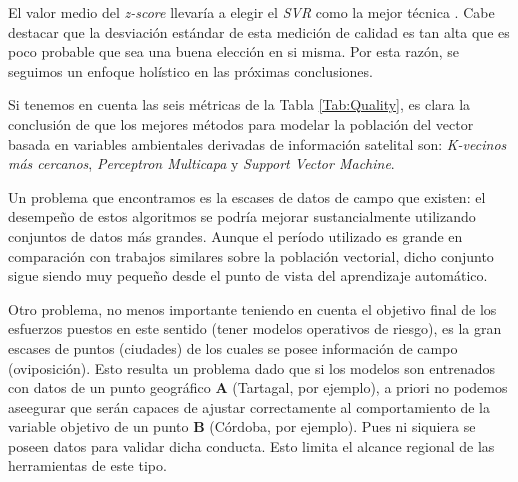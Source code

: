   \par El valor medio del \textit{z-score} llevaría a elegir el \textit{SVR}
    como la mejor técnica \cite{ml_rainfall}. Cabe destacar que la desviación
    estándar de esta medición de calidad es tan alta que es poco probable que
    sea una buena elección en si misma. Por esta razón, se seguimos un
    enfoque holístico en las próximas conclusiones.


  \par Si tenemos en cuenta las seis métricas de la Tabla \ref{Tab:Quality},
    es clara la conclusión de que los mejores métodos para modelar la población
    del vector basada en variables ambientales derivadas de información satelital
    son: \textit{K-vecinos más cercanos}, \textit{Perceptron
    Multicapa} y \textit{Support Vector Machine}.

  \par Un problema que encontramos es la escases de datos de campo que existen:
    el desempeño de estos algoritmos se podría mejorar sustancialmente utilizando
    conjuntos de datos más grandes.
    Aunque el período utilizado es grande en comparación con trabajos similares
    sobre la población vectorial, dicho conjunto sigue siendo
    muy pequeño desde el punto de vista del aprendizaje automático.

  \par Otro problema, no menos importante teniendo en cuenta el objetivo final
    de los esfuerzos puestos en este sentido (tener modelos operativos de
    riesgo), es la gran escases de puntos (ciudades) de los cuales se posee información
    de campo (oviposición). Esto resulta un problema dado que si los modelos son
    entrenados con datos de un punto geográfico \textbf{A} (Tartagal, por ejemplo), a
    priori no podemos aseegurar que serán capaces de ajustar correctamente al
    comportamiento de la variable objetivo de un punto \textbf{B} (Córdoba, por ejemplo).
    Pues ni siquiera se poseen datos para validar dicha conducta.
    Esto limita el alcance regional de las herramientas de este tipo.

